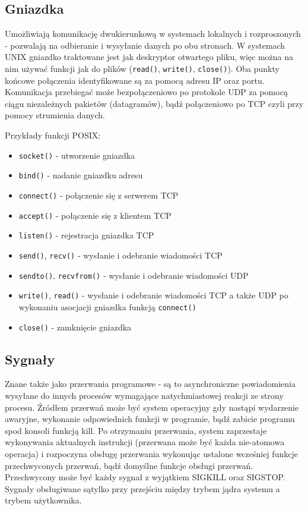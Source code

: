 \subsection{Gniazdka}

Umożliwiają komunikację dwukierunkową w systemach lokalnych i rozproszonych - pozwalają na odbieranie i wysyłanie danych po obu stronach. W systemach UNIX gniazdko traktowane jest jak deskryptor otwartego pliku, więc można na nim używać funkcji jak do plików (\texttt{read()}, \texttt{write()}, \texttt{close()}). Oba punkty końcowe połączenia identyfikowane są za pomocą adresu IP oraz portu. Komunikacja przebiegać może bezpołączeniowo po protokole UDP za pomocą ciągu niezależnych pakietów (datagramów), bądź połączeniowo po TCP czyli przy pomocy strumienia danych.

Przykłady funkcji POSIX:
\begin{itemize}
	\item \texttt{socket()} - utworzenie gniazdka
    \item \texttt{bind()} - nadanie gniazdku adresu
    \item \texttt{connect()} - połączenie się z serwerem TCP
    \item \texttt{accept()} - połączenie się z klientem TCP
    \item \texttt{listen()} - rejestracja gniazdka TCP
    \item \texttt{send()}, \texttt{recv()} - wysłanie i odebranie wiadomości TCP
    \item \texttt{sendto()}, \texttt{recvfrom()} - wysłanie i odebranie wiadomości UDP 
    \item \texttt{write()}, \texttt{read()} - wysłanie i odebranie wiadomości TCP a także UDP po wykonaniu asocjacji gniazdka funkcją \texttt{connect()}
    \item \texttt{close()} - zamknięcie gniazdka
\end{itemize}

\subsection{Sygnały}

Znane także jako przerwania programowe - są to asynchroniczne powiadomienia wysyłane do innych procesów wymagające natychmiastowej reakcji ze strony procesu. Źródłem przerwań może być system operacyjny gdy nastąpi wydarzenie awaryjne, wykonanie odpowiednich funkcji w programie, bądź zabicie programu spod konsoli funkcją kill. Po otrzymaniu przerwania, system zaprzestaje wykonywania aktualnych instrukcji (przerwana może być każda nie-atomowa operacja) i rozpoczyna obsługę przerwania wykonując ustalone wcześniej funkcje przechwyconych przerwań, bądź domyślne funkcje obsługi przerwań. Przechwycony może być każdy sygnał z wyjątkiem SIGKILL oraz SIGSTOP. Sygnały obsługiwane sątylko przy przejściu między trybem jądra systemu a trybem użytkownika.

